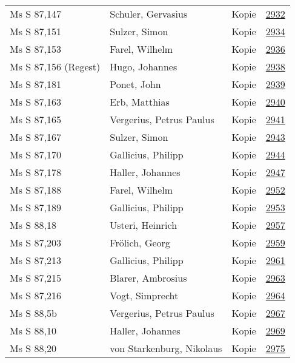 \documentclass[10pt,a4paper,landscape]{report}
\begin{document}
\begin{longtable}{p{16cm}p{4cm}lr}
Ms S 87,147	&	Schuler, Gervasius	&	Kopie	&	\href{http://130.60.24.72/assignment/2932}{2932}\\
Ms S 87,151	&	Sulzer, Simon	&	Kopie	&	\href{http://130.60.24.72/assignment/2934}{2934}\\
Ms S 87,153	&	Farel, Wilhelm	&	Kopie	&	\href{http://130.60.24.72/assignment/2936}{2936}\\
Ms S 87,156 (Regest)	&	Hugo, Johannes	&	Kopie	&	\href{http://130.60.24.72/assignment/2938}{2938}\\
Ms S 87,181	&	Ponet, John	&	Kopie	&	\href{http://130.60.24.72/assignment/2939}{2939}\\
Ms S 87,163	&	Erb, Matthias	&	Kopie	&	\href{http://130.60.24.72/assignment/2940}{2940}\\
Ms S 87,165	&	Vergerius, Petrus Paulus	&	Kopie	&	\href{http://130.60.24.72/assignment/2941}{2941}\\
Ms S 87,167	&	Sulzer, Simon	&	Kopie	&	\href{http://130.60.24.72/assignment/2943}{2943}\\
Ms S 87,170	&	Gallicius, Philipp	&	Kopie	&	\href{http://130.60.24.72/assignment/2944}{2944}\\
Ms S 87,178	&	Haller, Johannes	&	Kopie	&	\href{http://130.60.24.72/assignment/2947}{2947}\\
Ms S 87,188	&	Farel, Wilhelm	&	Kopie	&	\href{http://130.60.24.72/assignment/2952}{2952}\\
Ms S 87,189	&	Gallicius, Philipp	&	Kopie	&	\href{http://130.60.24.72/assignment/2953}{2953}\\
Ms S 88,18	&	Usteri, Heinrich	&	Kopie	&	\href{http://130.60.24.72/assignment/2957}{2957}\\
Ms S 87,203	&	Frölich, Georg	&	Kopie	&	\href{http://130.60.24.72/assignment/2959}{2959}\\
Ms S 87,213	&	Gallicius, Philipp	&	Kopie	&	\href{http://130.60.24.72/assignment/2961}{2961}\\
Ms S 87,215	&	Blarer, Ambrosius	&	Kopie	&	\href{http://130.60.24.72/assignment/2963}{2963}\\
Ms S 87,216	&	Vogt, Simprecht	&	Kopie	&	\href{http://130.60.24.72/assignment/2964}{2964}\\
Ms S 88,5b	&	Vergerius, Petrus Paulus	&	Kopie	&	\href{http://130.60.24.72/assignment/2967}{2967}\\
Ms S 88,10	&	Haller, Johannes	&	Kopie	&	\href{http://130.60.24.72/assignment/2969}{2969}\\
Ms S 88,20	&	von Starkenburg, Nikolaus	&	Kopie	&	\href{http://130.60.24.72/assignment/2975}{2975}\\

\end{longtable}
\end{document}
